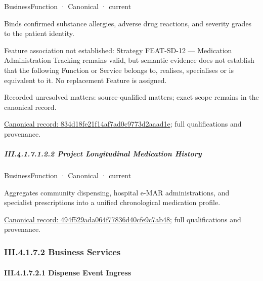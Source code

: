 \label{element:834d18fe21f14af7ad0c9773d2aaad1e}
{\small BusinessFunction · Canonical · current}\par

Binds confirmed substance allergies, adverse drug reactions, and severity grades to the patient identity.



Feature association not established: Strategy FEAT-SD-12 — Medication Administration Tracking remains valid, but semantic evidence does not establish that the following Function or Service belongs to, realises, specialises or is equivalent to it. No replacement Feature is assigned.


{\small Recorded unresolved matters: source-qualified matters; exact scope remains in the canonical record.}\par
{\footnotesize \href{../../../../continuum/business/business-function/834d18fe21f14af7ad0c9773d2aaad1e.md}{Canonical record: 834d18fe21f14af7ad0c9773d2aaad1e}; full qualifications and provenance.}\par
\subparagraph*{III.4.1.7.1.2.2 Project Longitudinal Medication History}
\label{navigation:III.4.1.7.1.2.2}

\label{element:494f529ada064f77836d40cfe9c7ab48}
{\small BusinessFunction · Canonical · current}\par

Aggregates community dispensing, hospital e-MAR administrations, and specialist prescriptions into a unified chronological medication profile.


{\footnotesize \href{../../../../continuum/business/business-function/494f529ada064f77836d40cfe9c7ab48.md}{Canonical record: 494f529ada064f77836d40cfe9c7ab48}; full qualifications and provenance.}\par
\subsubsection*{III.4.1.7.2 Business Services}
\label{navigation:III.4.1.7.2}

\paragraph*{III.4.1.7.2.1 Dispense Event Ingress}
\label{navigation:III.4.1.7.2.1}

